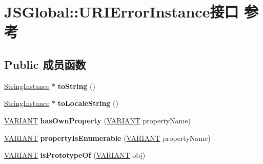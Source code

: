 \hypertarget{interface_j_s_global_1_1_u_r_i_error_instance}{}\section{J\+S\+Global\+:\+:U\+R\+I\+Error\+Instance接口 参考}
\label{interface_j_s_global_1_1_u_r_i_error_instance}
\subsection*{Public 成员函数}
\begin{DoxyCompactItemize}
\item 
\mbox{\label{interface_j_s_global_1_1_u_r_i_error_instance_afb195e4ca9bf880893512f9c84f12132}} 
\hyperlink{interface_j_s_global_1_1_string_instance}{String\+Instance} $\ast$ {\bfseries to\+String} ()
\item 
\mbox{\label{interface_j_s_global_1_1_u_r_i_error_instance_a861df48b814480e5329be2d95c2e6fd8}} 
\hyperlink{interface_j_s_global_1_1_string_instance}{String\+Instance} $\ast$ {\bfseries to\+Locale\+String} ()
\item 
\mbox{\label{interface_j_s_global_1_1_u_r_i_error_instance_a86548f8741765040d0a36652e58f2680}} 
\hyperlink{structtag_v_a_r_i_a_n_t}{V\+A\+R\+I\+A\+NT} {\bfseries has\+Own\+Property} (\hyperlink{structtag_v_a_r_i_a_n_t}{V\+A\+R\+I\+A\+NT} property\+Name)
\item 
\mbox{\label{interface_j_s_global_1_1_u_r_i_error_instance_ab7e720cad823e2838fb622b7ae4c396d}} 
\hyperlink{structtag_v_a_r_i_a_n_t}{V\+A\+R\+I\+A\+NT} {\bfseries property\+Is\+Enumerable} (\hyperlink{structtag_v_a_r_i_a_n_t}{V\+A\+R\+I\+A\+NT} property\+Name)
\item 
\mbox{\label{interface_j_s_global_1_1_u_r_i_error_instance_a7f5b63ffe6d31c86a4eeb4323b743245}} 
\hyperlink{structtag_v_a_r_i_a_n_t}{V\+A\+R\+I\+A\+NT} {\bfseries is\+Prototype\+Of} (\hyperlink{structtag_v_a_r_i_a_n_t}{V\+A\+R\+I\+A\+NT} obj)
\end{DoxyCompactItemize}
